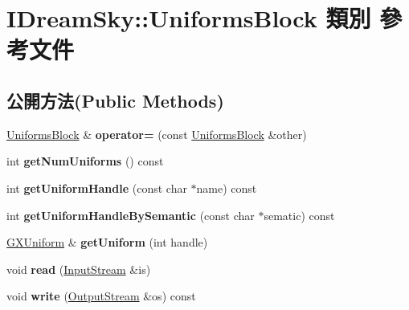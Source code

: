 \hypertarget{class_i_dream_sky_1_1_uniforms_block}{}\section{I\+Dream\+Sky\+:\+:Uniforms\+Block 類別 參考文件}
\label{class_i_dream_sky_1_1_uniforms_block}
\subsection*{公開方法(Public Methods)}
\begin{DoxyCompactItemize}
\item 
\hyperlink{class_i_dream_sky_1_1_uniforms_block}{Uniforms\+Block} \& {\bfseries operator=} (const \hyperlink{class_i_dream_sky_1_1_uniforms_block}{Uniforms\+Block} \&other)\hypertarget{class_i_dream_sky_1_1_uniforms_block_a17c7aa1f0e3d8f5a6a35da5ee2e08d74}{}\label{class_i_dream_sky_1_1_uniforms_block_a17c7aa1f0e3d8f5a6a35da5ee2e08d74}

\item 
int {\bfseries get\+Num\+Uniforms} () const \hypertarget{class_i_dream_sky_1_1_uniforms_block_a83087cbc5efdd428ae38fa583b6661c3}{}\label{class_i_dream_sky_1_1_uniforms_block_a83087cbc5efdd428ae38fa583b6661c3}

\item 
int {\bfseries get\+Uniform\+Handle} (const char $\ast$name) const \hypertarget{class_i_dream_sky_1_1_uniforms_block_a0dea4301536ec2e35ea63e297dc88044}{}\label{class_i_dream_sky_1_1_uniforms_block_a0dea4301536ec2e35ea63e297dc88044}

\item 
int {\bfseries get\+Uniform\+Handle\+By\+Semantic} (const char $\ast$sematic) const \hypertarget{class_i_dream_sky_1_1_uniforms_block_a1f181f90284693d6741c7c3a422e6a09}{}\label{class_i_dream_sky_1_1_uniforms_block_a1f181f90284693d6741c7c3a422e6a09}

\item 
\hyperlink{class_i_dream_sky_1_1_g_x_uniform}{G\+X\+Uniform} \& {\bfseries get\+Uniform} (int handle)\hypertarget{class_i_dream_sky_1_1_uniforms_block_a5dcfce65c3f94a745fb0376afdd82e72}{}\label{class_i_dream_sky_1_1_uniforms_block_a5dcfce65c3f94a745fb0376afdd82e72}

\item 
void {\bfseries read} (\hyperlink{class_i_dream_sky_1_1_input_stream}{Input\+Stream} \&is)\hypertarget{class_i_dream_sky_1_1_uniforms_block_aabdfa44aa384fac8980a86dca5a8a729}{}\label{class_i_dream_sky_1_1_uniforms_block_aabdfa44aa384fac8980a86dca5a8a729}

\item 
void {\bfseries write} (\hyperlink{class_i_dream_sky_1_1_output_stream}{Output\+Stream} \&os) const \hypertarget{class_i_dream_sky_1_1_uniforms_block_aeade20ddba4399d4353ba098bab09b10}{}\label{class_i_dream_sky_1_1_uniforms_block_aeade20ddba4399d4353ba098bab09b10}

\end{DoxyCompactItemize}
